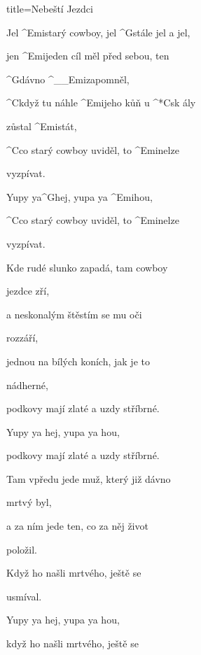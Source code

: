 \begin{song}{title=\predtitle\centering Nebeští Jezdci \\\large \vspace*{-0.3cm}}  %
\begin{centerjustified}

\begin{varwidth}[t]{0.57\textwidth}\setlength{\parindent}{0.45cm}  %

\sloka
	Jel ^{Emi\z}starý cowboy, jel ^{G\z}stále jel a jel,
	
	jen ^{Emi\z}jeden cíl měl před sebou, ten 

	^{G\z}dávno ^{{\color{white}\_\_}Emi}zapomněl,
	
	^{C\z}když tu náhle ^{Emi\z}jeho kůň u ^*{C}sk ály 

	zůstal 	^{Emi}stát,
	
	^{C}co starý cowboy uviděl, to ^{Emi\z}nelze 

	vyzpívat.
	
	Yupy ya^{G}hej, yupa ya ^{Emi}hou,
	
	^{C}co starý cowboy uviděl, to ^{Emi\z}nelze 

	vyzpívat.
	
\sloka
	Kde rudé slunko zapadá, tam cowboy 

	jezdce zří,
	
	a neskonalým štěstím se mu oči 

	rozzáří,
	
	jednou na bílých koních, jak je to 

	nádherné,
	
	podkovy mají zlaté a uzdy stříbrné.
	
	Yupy ya hej, yupa ya hou,
	
	podkovy mají zlaté a uzdy stříbrné.
	
\sloka
	Tam vpředu jede muž, který již dávno 

	mrtvý byl,
	
	a za ním jede ten, co za něj život 

	položil.
	
	
	Když ho našli mrtvého, ještě se 

	usmíval.
	
	Yupy ya hej, yupa ya hou,
	
	když ho našli mrtvého, ještě se 


\end{varwidth}
\end{centerjustified}
\end{song}
